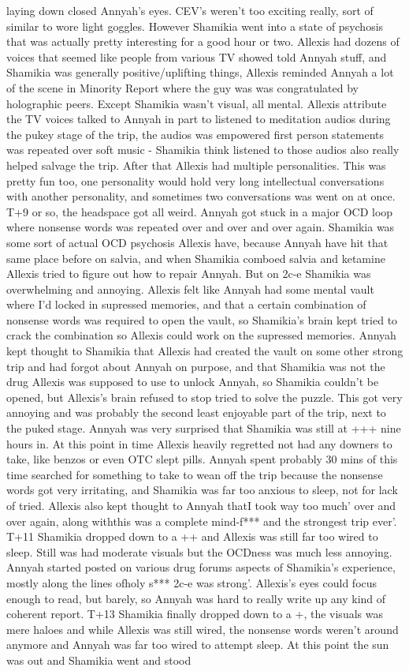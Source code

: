\documentclass[12pt]{book}
\begin{document}
laying down closed Annyah's eyes. CEV's weren't too exciting really, sort of similar to wore light goggles. However Shamikia went into a state of psychosis that was actually pretty interesting for a good hour or two. Allexis had dozens of voices that seemed like people from various TV showed told Annyah stuff, and Shamikia was generally positive/uplifting things, Allexis reminded Annyah a lot of the scene in Minority Report where the guy was was congratulated by holographic peers. Except Shamikia wasn't visual, all mental. Allexis attribute the TV voices talked to Annyah in part to listened to meditation audios during the pukey stage of the trip, the audios was empowered first person statements was repeated over soft music - Shamikia think listened to those audios also really helped salvage the trip. After that Allexis had multiple personalities. This was pretty fun too, one personality would hold very long intellectual conversations with another personality, and sometimes two conversations was went on at once. T+9 or so, the headspace got all weird. Annyah got stuck in a major OCD loop where nonsense words was repeated over and over and over again. Shamikia was some sort of actual OCD psychosis Allexis have, because Annyah have hit that same place before on salvia, and when Shamikia comboed salvia and ketamine Allexis tried to figure out how to repair Annyah. But on 2c-e Shamikia was overwhelming and annoying. Allexis felt like Annyah had some mental vault where I'd locked in supressed memories, and that a certain combination of nonsense words was required to open the vault, so Shamikia's brain kept tried to crack the combination so Allexis could work on the supressed memories. Annyah kept thought to Shamikia that Allexis had created the vault on some other strong trip and had forgot about Annyah on purpose, and that Shamikia was not the drug Allexis was supposed to use to unlock Annyah, so Shamikia couldn't be opened, but Allexis's brain refused to stop tried to solve the puzzle. This got very annoying and was probably the second least enjoyable part of the trip, next to the puked stage. Annyah was very surprised that Shamikia was still at +++ nine hours in. At this point in time Allexis heavily regretted not had any downers to take, like benzos or even OTC slept pills. Annyah spent probably 30 mins of this time searched for something to take to wean off the trip because the nonsense words got very irritating, and Shamikia was far too anxious to sleep, not for lack of tried. Allexis also kept thought to Annyah thatI took way too much' over and over again, along withthis was a complete mind-f*** and the strongest trip ever'. T+11 Shamikia dropped down to a ++ and Allexis was still far too wired to sleep. Still was had moderate visuals but the OCDness was much less annoying. Annyah started posted on various drug forums aspects of Shamikia's experience, mostly along the lines ofholy s*** 2c-e was strong'. Allexis's eyes could focus enough to read, but barely, so Annyah was hard to really write up any kind of coherent report. T+13 Shamikia finally dropped down to a +, the visuals was mere haloes and while Allexis was still wired, the nonsense words weren't around anymore and Annyah was far too wired to attempt sleep. At this point the sun was out and Shamikia went and stood 
\end{document}
